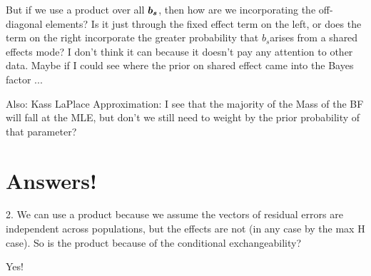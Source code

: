 \documentclass[10pt]{article}
\newcommand{\bs}{\mbox{\boldmath$b_{s}$}}
\begin{document}
But if we use a product over all $\bs$, then how are we incorporating the off-diagonal elements? Is it just through the fixed effect term on the left, or does the term on the right incorporate the greater probability that \bs arises from a shared effects mode? I don't think it can because it doesn't pay any attention to other data. Maybe if I could see where the prior on shared effect came into the Bayes factor ...

Also: Kass LaPlace Approximation: I see that the majority of the Mass of the BF will fall at the MLE, but don't we still need to weight by the prior probability of that parameter?

\section{Answers!}

\item{2. We can use a product because we assume the vectors of residual errors are independent across populations, but the effects are not (in any case by the max H case). So is the product because of the conditional exchangeability?}

Yes! 
\end{document}
